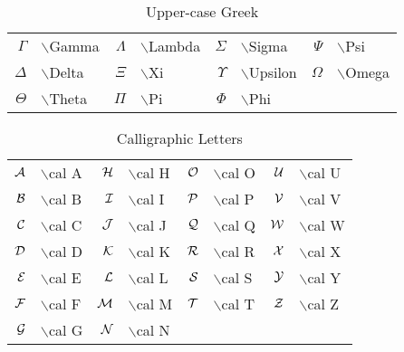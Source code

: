 \begin{table}
\centering
\caption{Upper-case Greek}
\vspace{\baselineskip}
\tablerule
\begin{tabular}{rlrlrlrl}
$\Gamma$&$\backslash$Gamma&
$\Lambda$&$\backslash$Lambda&
$\Sigma$&$\backslash$Sigma&
$\Psi$&$\backslash$Psi\\
$\Delta$&$\backslash$Delta&
$\Xi$&$\backslash$Xi&
$\Upsilon$&$\backslash$Upsilon&
$\Omega$&$\backslash$Omega\\
$\Theta$&$\backslash$Theta&
$\Pi$&$\backslash$Pi&
$\Phi$&$\backslash$Phi&
\end{tabular}
\tablerule
\end{table}
 
\begin{table}
\centering
\caption{Calligraphic Letters}
\vspace{\baselineskip}
\tablerule
\begin{tabular}{rlrlrlrl}
$\cal A$&$\backslash$cal A&
$\cal H$&$\backslash$cal H&
$\cal O$&$\backslash$cal O&
$\cal U$&$\backslash$cal U\\
$\cal B$&$\backslash$cal B&
$\cal I$&$\backslash$cal I&
$\cal P$&$\backslash$cal P&
$\cal V$&$\backslash$cal V\\
$\cal C$&$\backslash$cal C&
$\cal J$&$\backslash$cal J&
$\cal Q$&$\backslash$cal Q&
$\cal W$&$\backslash$cal W\\
$\cal D$&$\backslash$cal D&
$\cal K$&$\backslash$cal K&
$\cal R$&$\backslash$cal R&
$\cal X$&$\backslash$cal X\\
$\cal E$&$\backslash$cal E&
$\cal L$&$\backslash$cal L&
$\cal S$&$\backslash$cal S&
$\cal Y$&$\backslash$cal Y\\
$\cal F$&$\backslash$cal F&
$\cal M$&$\backslash$cal M&
$\cal T$&$\backslash$cal T&
$\cal Z$&$\backslash$cal Z\\
$\cal G$&$\backslash$cal G&
$\cal N$&$\backslash$cal N&&
\end{tabular}
\tablerule
\end{table}
 
